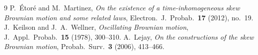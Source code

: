 \documentclass[11pt]{article}
\theoremstyle{definition}
\begin{document}
\begin{thebibliography}{9}
P.~\'Etor\'e and M.~Martinez,
\emph{On the existence of a time-inhomogeneous skew Brownian motion and some related laws},
Electron.\ J.\ Probab.\ \textbf{17} (2012), no.~19.
J.~Keilson and J.~A.~Wellner,
\emph{Oscillating Brownian motion},
J.\ Appl.\ Probab.\ \textbf{15} (1978), 300--310.
A.~Lejay,
\emph{On the constructions of the skew Brownian motion},
Probab.\ Surv.\ \textbf{3} (2006), 413--466.
\end{thebibliography}
\end{document}
